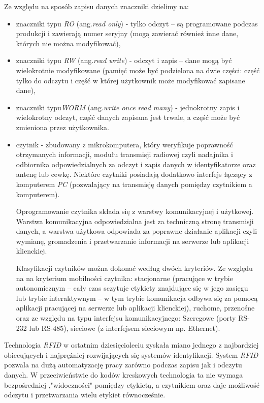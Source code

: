\begin{itemize}
\begin{itemize}
	Ze względu na sposób zapisu danych znaczniki dzielimy na:

	\begin{itemize}\setlength{\itemsep}{0pt}

	\item znaczniki typu \emph{RO} (ang.\emph{read only}) - tylko odczyt – są programowane podczas produkcji i zawierają numer seryjny (mogą zawierać również inne dane, których nie można modyfikować), 

	\item znaczniki typu \emph{RW} (ang.\emph{read write}) - odczyt i zapis – dane mogą być wielokrotnie modyfikowane (pamięć może być podzielona na dwie części: część tylko do odczytu i część w której użytkownik może modyfikować zapisane dane),

	\item znaczniki typu\emph{WORM} (ang.\emph{write once read many}) - jednokrotny zapis i wielokrotny odczyt, część danych zapisana jest trwale, a część może być zmieniona przez użytkownika.
	
	\item czytnik - zbudowany z mikrokomputera, który weryfikuje poprawność otrzymanych informacji, modułu transmisji radiowej czyli nadajnika i odbiornika  odpowiedzialnych za odczyt i zapis danych w identyfikatorze oraz antenę lub cewkę. Niektóre czytniki posiadają dodatkowo interfejs łączący z komputerem \emph{PC} (pozwalający na transmisję danych pomiędzy czytnikiem a komputerem).
	
	Oprogramowanie czytnika składa się z warstwy komunikacyjnej i użytkowej. Warstwa komunikacyjna odpowiedzialna jest za techniczną stronę transmisji danych, a warstwa użytkowa odpowiada za poprawne działanie aplikacji czyli wymianę, gromadzenia i przetwarzanie informacji na serwerze lub aplikacji klienckiej.
	
	Klasyfikacji czytników można dokonać według dwóch kryteriów. Ze względu na na kryterium mobilności czytnika: stacjonarne (pracujące w trybie autonomicznym – cały czas sczytuje etykiety znajdujące się w jego zasięgu lub trybie interaktywnym – w tym trybie komunikacja odbywa się za pomocą aplikacji pracującej na serwerze lub aplikacji klienckiej), ruchome, przenośne oraz ze względu na typu interfejsu komunikacyjnego:
	Szeregowe (porty RS-232 lub RS-485), sieciowe (z interfejsem sieciowym np. Ethernet).

\end{itemize}

Technologia \emph{RFID} w ostatnim dziesięcioleciu zyskała miano jednego z najbardziej obiecujących i najprężniej rozwijających się systemów identyfikacji. System \emph{RFID} pozwala na dużą automatyzację pracy zarówno podczas zapisu jak i odczytu danych. W przeciwieństwie do kodów kreskowych technologia ta nie wymaga bezpośredniej ,"widoczności" pomiędzy etykietą, a czytnikiem oraz daje możliwość odczytu i przetwarzania wielu etykiet równocześnie.


\end{itemize}
\end{itemize}
